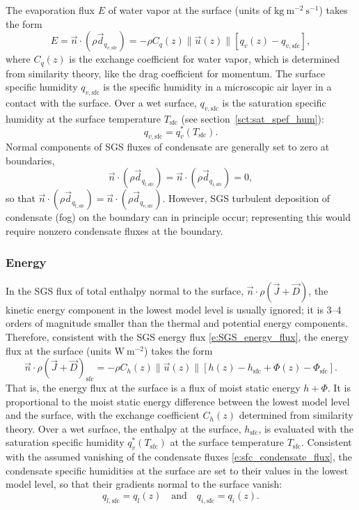 \documentclass{article}
\begin{document}
The evaporation flux $E$ of water vapor at the surface (units of $\mathrm{kg~m^{-2}~s^{-1}}$) takes the form 
\begin{equation}\label{e:sfc_evaporation}
E = \vec{n} \cdot (\rho \vec{d}_{q_{v, \mathrm{sfc}}}) = - \rho C_q(z) \| \vec{u}(z) \| \left[q_{v}(z) - q_{v, \mathrm{sfc}} \right],
\end{equation} 
where $C_q(z)$ is the exchange coefficient for water vapor, which is determined from similarity theory, like the drag coefficient for momentum. The surface specific humidity $q_{v, \mathrm{sfc}}$ is the specific humidity in a microscopic air layer in a contact with the surface. Over a wet surface, $q_{v, \mathrm{sfc}}$ is the saturation specific humidity at the surface temperature $T_\mathrm{sfc}$ (see section~\ref{sct:sat_spef_hum}): 
\[
q_{v, \mathrm{sfc}}=q_v^*(T_\mathrm{sfc}).
\]
Normal components of SGS fluxes of condensate are generally set to zero at boundaries,
\begin{equation}\label{e:sfc_condensate_flux}
\vec{n} \cdot (\rho \vec{d}_{q_{l, \mathrm{sfc}}}) = \vec{n} \cdot (\rho \vec{d}_{q_{i, \mathrm{sfc}}}) = 0,
\end{equation}
so that $\vec{n} \cdot (\rho \vec{d}_{q_{t, \mathrm{sfc}}}) = \vec{n} \cdot (\rho \vec{d}_{q_{v, \mathrm{sfc}}})$. However, SGS turbulent deposition of condensate (fog) on the boundary can in principle occur; representing this would require nonzero condensate fluxes at the boundary. 

\subsubsection{Energy}

In the SGS flux of total enthalpy normal to the surface, $\vec{n} \cdot \rho (\vec{J} + \vec{D})$, the kinetic energy component in the lowest model level is usually ignored; it is 3--4 orders of magnitude smaller than the thermal and potential energy components. Therefore, consistent with the SGS energy flux \eqref{e:SGS_energy_flux}, the energy flux at the surface (units $\mathrm{W~m^{-2}}$) takes the form
\begin{equation}\label{e:sfc_energy_flux}
\vec{n} \cdot \rho (\vec{J} + \vec{D})_\mathrm{sfc} = -\rho C_h(z) \| \vec{u}(z) \| \left[ h(z) - h_\mathrm{sfc} + \Phi(z) - \Phi_\mathrm{sfc} \right].
\end{equation}
That is, the energy flux at the surface is a flux of moist static energy $h + \Phi$. It is proportional to the moist static energy  difference between the lowest model level and the surface, with the exchange coefficient $C_h(z)$ determined from similarity theory. Over a wet surface, the enthalpy at the surface, $h_\mathrm{sfc}$, is evaluated with the saturation specific humidity $q_v^*(T_\mathrm{sfc})$ at the surface temperature $T_\mathrm{sfc}$. Consistent with the assumed vanishing of the condensate fluxes \eqref{e:sfc_condensate_flux}, the condensate specific humidities at the surface are set to their values in the lowest model level, so that their gradients normal to the surface vanish:
\[
q_{l, \mathrm{sfc}} = q_l(z) \quad \text{and} \quad q_{i, \mathrm{sfc}} = q_i(z).
\]
\end{document}
